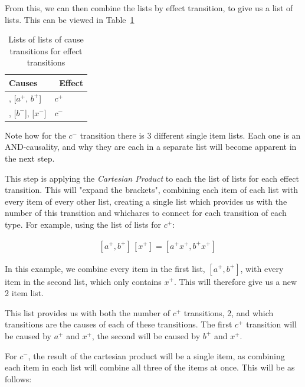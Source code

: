 \documentclass[british,conference,compsoc]{IEEEtran}
\begin{document}
\noindent From this, we can then combine the lists by effect transition, to give us a list of lists.
This can be viewed in Table~\ref{tab:list-of-lists}

\begin{table}[h]
\caption{Lists of lists of cause transitions for effect transitions\label{tab:list-of-lists}}

  \centering
\begin{tabular}[htb]{| m{2.6cm} | m{2.0cm} |}
  \hline
Causes & \, Effect \\ \hline \hline
[$x^{+}$], [$a^{+}$, $b^{+}$] & $c^{+}$ \\ \hline
[$a^{-}$], [$b^{-}$], [$x^{-}$] & $c^{-}$ \\ \hline

  \end{tabular}
\end{table}

\noindent Note how for the $c^{-}$ transition there is 3 different single item 
lists. Each one is an AND-causality, and why they are each in a separate list
will become apparent in the next step. 

This step is applying the \emph{Cartesian Product} to each the list of lists
for each effect transition. This will "expand the brackets", combining each
item of each list with every item of every other list, creating a single list which
provides us with the number of this transition and  whicharcs to connect 
for each transition of each type. 
For example, using the list of lists for $c^{+}$:

\[
\begin{array}{lcl}
~&[a^{+}, b^{+}]\, [x^{+}] = [a^{+} x^{+}, b^{+} x^{+}]
\end{array}
\]

\noindent In this example, we combine every item in the first list,
$[a^{+}, b^{+}]$, with every item in the second list, which only 
contains $x^{+}$. This will therefore give us a new 2 item list. 

This list provides us with both the number of $c^{+}$ transitions,
2, and which transitions are the causes of each of these transitions.
The first $c^{+}$ transition will be caused by $a^{+}$ and $x^{+}$,
the second will be caused by $b^{+}$ and $x^{+}$. 

For $c^{-}$, the result of the cartesian product will be a single item,
as combining each item in each list will combine all three of the items 
at once. This will be as follows:
\end{document}
